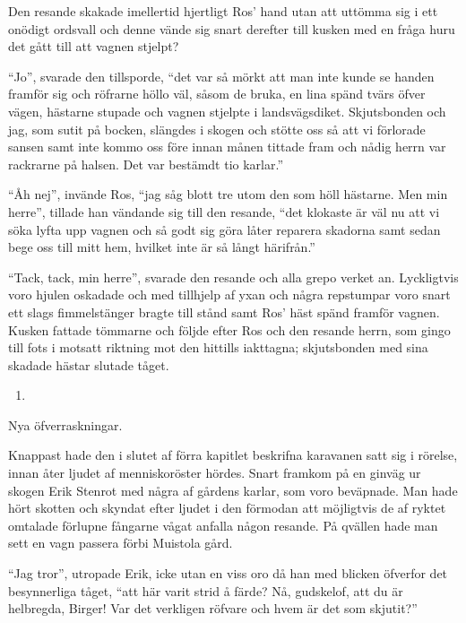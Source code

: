Den resande skakade imellertid hjertligt Ros' hand utan att uttömma sig
i ett onödigt ordsvall och denne vände sig snart derefter till kusken
med en fråga huru det gått till att vagnen stjelpt?

``Jo'', svarade den tillsporde, ``det var så mörkt att man inte kunde se
handen framför sig och röfrarne höllo väl, såsom de bruka, en lina spänd
tvärs öfver vägen, hästarne stupade och vagnen stjelpte i
landsvägsdiket. Skjutsbonden och jag, som sutit på bocken, slängdes i
skogen och stötte oss så att vi förlorade sansen samt inte kommo oss
före innan månen tittade fram och nådig herrn var rackrarne på halsen.
Det var bestämdt tio karlar.''

``Åh nej'', invände Ros, ``jag såg blott tre utom den som höll hästarne.
Men min herre'', tillade han vändande sig till den resande, ``det
klokaste är väl nu att vi söka lyfta upp vagnen och så godt sig göra
låter reparera skadorna samt sedan bege oss till mitt hem, hvilket inte
är så långt härifrån.''

``Tack, tack, min herre'', svarade den resande och alla grepo verket an.
Lyckligtvis voro hjulen oskadade och med tillhjelp af yxan och några
repstumpar voro snart ett slags fimmelstänger bragte till stånd samt
Ros' häst spänd framför vagnen. Kusken fattade tömmarne och följde efter
Ros och den resande herrn, som gingo till fots i motsatt riktning mot
den hittills iakttagna; skjutsbonden med sina skadade hästar slutade
tåget.

\begin{enumerate}
\def\labelenumi{\arabic{enumi}.}
\setcounter{enumi}{19}
\tightlist
\item
\end{enumerate}

Nya öfverraskningar.

Knappast hade den i slutet af förra kapitlet beskrifna karavanen satt
sig i rörelse, innan åter ljudet af menniskoröster hördes. Snart framkom
på en ginväg ur skogen Erik Stenrot med några af gårdens karlar, som
voro beväpnade. Man hade hört skotten och skyndat efter ljudet i den
förmodan att möjligtvis de af ryktet omtalade förlupne fångarne vågat
anfalla någon resande. På qvällen hade man sett en vagn passera förbi
Muistola gård.

``Jag tror'', utropade Erik, icke utan en viss oro då han med blicken
öfverfor det besynnerliga tåget, ``att här varit strid å färde? Nå,
gudskelof, att du är helbregda, Birger! Var det verkligen röfvare och
hvem är det som skjutit?''

